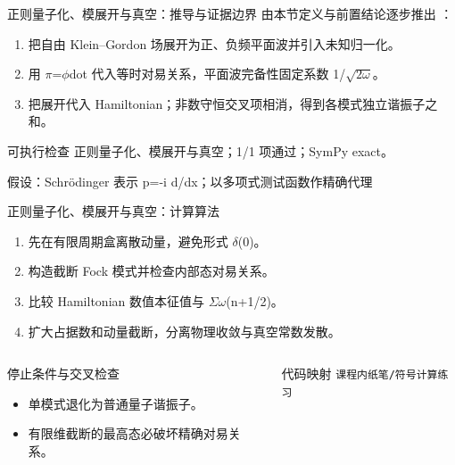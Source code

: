\begin{frame}[t]{正则量子化、模展开与真空：推导与证据边界}
\footnotesize
{}\quad 由本节定义与前置结论逐步推出 ：
\begin{enumerate}
\item 把自由 Klein--Gordon 场展开为正、负频平面波并引入未知归一化。
\item 用 \ensuremath{\pi}=\ensuremath{\phi}dot 代入等时对易关系，平面波完备性固定系数 1/\allowbreak{}\ensuremath{\sqrt{2\omega}}。
\item 把展开代入 Hamiltonian；非数守恒交叉项相消，得到各模式独立谐振子之和。
\end{enumerate}\begin{block}{可执行检查}
\quad 正则量子化、模展开与真空；1/1 项通过；SymPy exact。
\par\scriptsize 假设：Schrödinger 表示 p=-i d/\allowbreak{}dx；以多项式测试函数作精确代理
\end{block}
\end{frame}

\begin{frame}[t]{正则量子化、模展开与真空：计算算法}
\footnotesize
{}\begin{enumerate}
\item 先在有限周期盒离散动量，避免形式 \ensuremath{\delta}(0)。
\item 构造截断 Fock 模式并检查内部态对易关系。
\item 比较 Hamiltonian 数值本征值与 \ensuremath{\Sigma}\ensuremath{\omega}(n+1/\allowbreak{}2)。
\item 扩大占据数和动量截断，分离物理收敛与真空常数发散。
\end{enumerate}\begin{columns}[T,onlytextwidth]
\begin{block}{停止条件与交叉检查}\scriptsize\begin{itemize}
\item[\CheckMark] 单模式退化为普通量子谐振子。
\item[\CheckMark] 有限维截断的最高态必破坏精确对易关系。
\end{itemize}\end{block}
\begin{block}{代码映射}
\scriptsize \texttt{课程内纸笔/\allowbreak{}符号计算练习}
\end{block}\end{columns}\end{frame}

